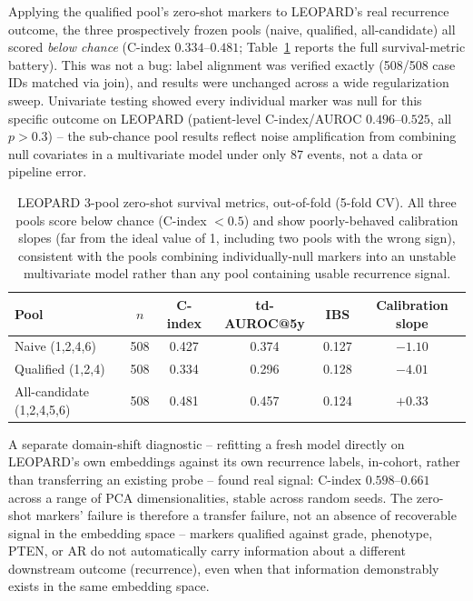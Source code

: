 Applying the qualified pool's zero-shot markers to LEOPARD's real recurrence outcome, the
three prospectively frozen pools (naive, qualified, all-candidate) all scored \emph{below chance}
(C-index $0.334$--$0.481$; Table~\ref{tab:leopard-survival} reports the full survival-metric
battery). This was not a bug: label alignment was verified exactly
(508/508 case IDs matched via join), and results were unchanged across a wide regularization
sweep. Univariate testing showed every individual marker was null for this specific outcome on
LEOPARD (patient-level C-index/AUROC $0.496$--$0.525$, all $p>0.3$) -- the sub-chance pool
results reflect noise amplification from combining null covariates in a multivariate model
under only 87 events, not a data or pipeline error.

\begin{table}[htbp]
\centering
\small
\begin{tabular}{lccccc}
\toprule
Pool & $n$ & C-index & td-AUROC@5y & IBS & Calibration slope \\
\midrule
Naive (1,2,4,6) & 508 & 0.427 & 0.374 & 0.127 & $-1.10$ \\
Qualified (1,2,4) & 508 & 0.334 & 0.296 & 0.128 & $-4.01$ \\
All-candidate (1,2,4,5,6) & 508 & 0.481 & 0.457 & 0.124 & $+0.33$ \\
\bottomrule
\end{tabular}
\caption{LEOPARD 3-pool zero-shot survival metrics, out-of-fold (5-fold CV). All three pools
score below chance (C-index $<0.5$) and show poorly-behaved calibration slopes (far from the
ideal value of 1, including two pools with the wrong sign), consistent with the pools combining
individually-null markers into an unstable multivariate model rather than any pool containing
usable recurrence signal.}
\label{tab:leopard-survival}
\end{table}

A separate domain-shift diagnostic -- refitting a fresh model directly on LEOPARD's own
embeddings against its own recurrence labels, in-cohort, rather than transferring an existing
probe -- found real signal: C-index $0.598$--$0.661$ across a range of PCA dimensionalities,
stable across random seeds. The zero-shot markers' failure is therefore a transfer failure, not
an absence of recoverable signal in the embedding space -- markers qualified against grade,
phenotype, PTEN, or AR do not automatically carry information about a different downstream
outcome (recurrence), even when that information demonstrably exists in the same embedding
space.

